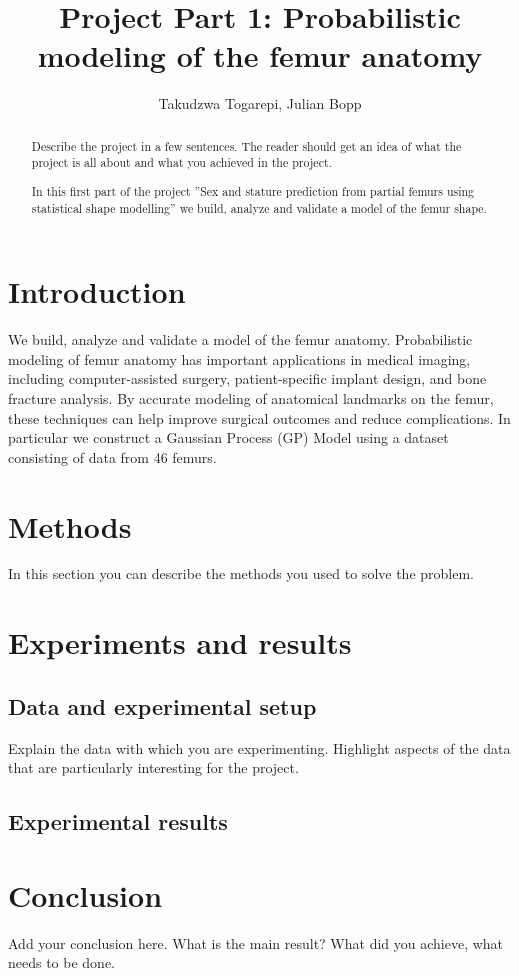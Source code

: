 \documentclass[10pt]{article}
\author{Takudzwa Togarepi, Julian Bopp }
\title{Project Part 1: Probabilistic modeling of the femur anatomy}
\begin{document}
\maketitle
\begin{abstract}
    Describe the project in a few sentences. 
    The reader should get an idea of what the project is all about
    and what you achieved in the project.


    In this first part of the project ''Sex and stature prediction from partial femurs using statistical shape modelling'' we build,
    analyze and validate a model of the femur shape.
\end{abstract}

\section{Introduction}

We build, analyze and validate a model of the femur anatomy. Probabilistic modeling of femur anatomy has important applications in medical imaging, including computer-assisted surgery, patient-specific implant design, and bone fracture analysis. By accurate modeling of anatomical landmarks on the femur, these techniques can help improve surgical outcomes and reduce complications. In particular we construct a Gaussian Process (GP) Model using a dataset consisting of data from 46 femurs.
\section{Methods}

In this section you can describe the methods you used to solve the problem.


\section{Experiments and results}

\subsection{Data and experimental setup}

Explain the data with which you are experimenting.
Highlight aspects of the data that are particularly interesting 
for the project. 

\subsection{Experimental results}


\section{Conclusion}

Add your conclusion here. What is the main result? What did you achieve, what 
needs to be done. 
\end{document}
